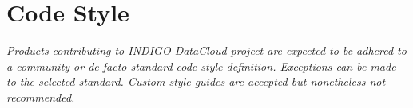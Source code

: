 \section{Code Style}
\footnotesize
\textcolor{gray!90}{\textit{Products contributing to INDIGO-DataCloud project are expected to be adhered to a community or de-facto standard code style definition. Exceptions can be made to the selected standard. Custom style guides are accepted but nonetheless not recommended.}}
\normalsize
\\[0.1in]
